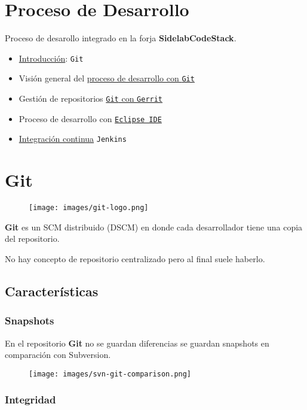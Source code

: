 \section{Proceso de Desarrollo}

Proceso de desarollo integrado en la forja \textbf{SidelabCodeStack}.

\begin{itemize}
\item
  \href{001-git-introduccion.html}{Introducción}: \texttt{Git}
\item
  Visión general del \href{002-proceso-git.html}{proceso de desarrollo
  con \texttt{Git}}
\item
  Gestión de repositorios \href{003-gerrit-git.html}{\texttt{Git} con
  \texttt{Gerrit}}
\item
  Proceso de desarrollo con
  \href{003-eclipse.html}{\texttt{Eclipse IDE}}
\item
  \href{004-jenkins.html}{Integración continua} \texttt{Jenkins}
\end{itemize}
\section{Git}

\begin{figure}[htbp]
\centering
\texttt{[image: images/git-logo.png]}
\caption{}
\end{figure}

\textbf{Git} es un SCM distribuido (DSCM) en donde cada desarrollador
tiene una copia del repositorio.

No hay concepto de repositorio centralizado pero al final suele haberlo.

\subsection{Características}

\subsubsection{Snapshots}

En el repositorio \textbf{Git} no se guardan diferencias se guardan
snapshots en comparación con Subversion.

\begin{figure}[htbp]
\centering
\texttt{[image: images/svn-git-comparison.png]}
\caption{}
\end{figure}

\subsubsection{Integridad}

